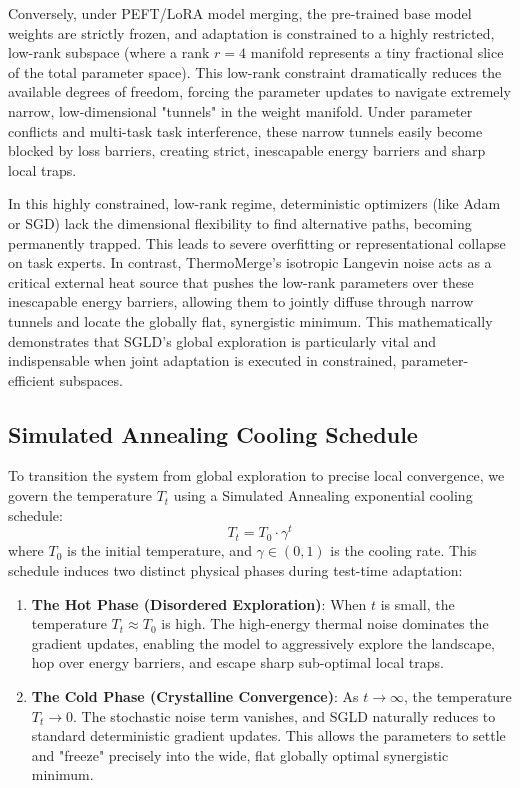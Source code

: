 Conversely, under PEFT/LoRA model merging, the pre-trained base model weights are strictly frozen, and adaptation is constrained to a highly restricted, low-rank subspace (where a rank $r = 4$ manifold represents a tiny fractional slice of the total parameter space).
This low-rank constraint dramatically reduces the available degrees of freedom, forcing the parameter updates to navigate extremely narrow, low-dimensional "tunnels" in the weight manifold.
Under parameter conflicts and multi-task task interference, these narrow tunnels easily become blocked by loss barriers, creating strict, inescapable energy barriers and sharp local traps.

In this highly constrained, low-rank regime, deterministic optimizers (like Adam or SGD) lack the dimensional flexibility to find alternative paths, becoming permanently trapped.
This leads to severe overfitting or representational collapse on task experts.
In contrast, ThermoMerge's isotropic Langevin noise acts as a critical external heat source that pushes the low-rank parameters over these inescapable energy barriers, allowing them to jointly diffuse through narrow tunnels and locate the globally flat, synergistic minimum.
This mathematically demonstrates that SGLD's global exploration is particularly vital and indispensable when joint adaptation is executed in constrained, parameter-efficient subspaces.

\subsection{Simulated Annealing Cooling Schedule}
To transition the system from global exploration to precise local convergence, we govern the temperature $T_t$ using a Simulated Annealing exponential cooling schedule:
\begin{equation}
    T_t = T_0 \cdot \gamma^t
\end{equation}
where $T_0$ is the initial temperature, and $\gamma \in (0, 1)$ is the cooling rate.
This schedule induces two distinct physical phases during test-time adaptation:
\begin{enumerate}
\item \textbf{The Hot Phase (Disordered Exploration)}: When $t$ is small, the temperature $T_t \approx T_0$ is high.
The high-energy thermal noise dominates the gradient updates, enabling the model to aggressively explore the landscape, hop over energy barriers, and escape sharp sub-optimal local traps.
\item \textbf{The Cold Phase (Crystalline Convergence)}: As $t \to \infty$, the temperature $T_t \to 0$.
The stochastic noise term vanishes, and SGLD naturally reduces to standard deterministic gradient updates.
This allows the parameters to settle and "freeze" precisely into the wide, flat globally optimal synergistic minimum.
\end{enumerate}

